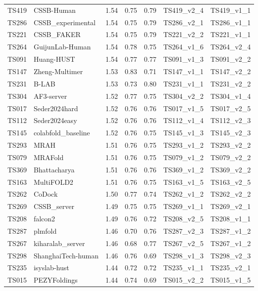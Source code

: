 \begin{table}[ht]
{\begin{tabular}{llrrrll}
TS419 & CSSB-Human & 1.54 & 0.75 & 0.79 & TS419\_v2\_4 & TS419\_v1\_1 \\ 
TS286 & CSSB\_experimental & 1.54 & 0.75 & 0.79 & TS286\_v2\_1 & TS286\_v1\_1 \\ 
TS221 & CSSB\_FAKER & 1.54 & 0.75 & 0.79 & TS221\_v2\_2 & TS221\_v1\_1 \\ 
TS264 & GuijunLab-Human & 1.54 & 0.78 & 0.75 & TS264\_v1\_6 & TS264\_v2\_4 \\ 
TS091 & Huang-HUST & 1.54 & 0.77 & 0.77 & TS091\_v1\_3 & TS091\_v2\_2 \\ 
TS147 & Zheng-Multimer & 1.53 & 0.83 & 0.71 & TS147\_v1\_1 & TS147\_v2\_2 \\ 
TS231 & B-LAB & 1.53 & 0.73 & 0.80 & TS231\_v1\_1 & TS231\_v2\_2 \\ 
TS304 & AF3-server & 1.52 & 0.77 & 0.75 & TS304\_v2\_2 & TS304\_v1\_4 \\ 
TS017 & Seder2024hard & 1.52 & 0.76 & 0.76 & TS017\_v1\_5 & TS017\_v2\_5 \\ 
TS112 & Seder2024easy & 1.52 & 0.76 & 0.76 & TS112\_v1\_4 & TS112\_v2\_3 \\ 
TS145 & colabfold\_baseline & 1.52 & 0.76 & 0.75 & TS145\_v1\_3 & TS145\_v2\_3 \\ 
TS293 & MRAH & 1.51 & 0.76 & 0.75 & TS293\_v1\_2 & TS293\_v2\_2 \\ 
TS079 & MRAFold & 1.51 & 0.76 & 0.75 & TS079\_v1\_2 & TS079\_v2\_2 \\ 
TS369 & Bhattacharya & 1.51 & 0.76 & 0.76 & TS369\_v1\_2 & TS369\_v2\_2 \\ 
TS163 & MultiFOLD2 & 1.51 & 0.76 & 0.75 & TS163\_v1\_5 & TS163\_v2\_5 \\ 
TS262 & CoDock & 1.50 & 0.77 & 0.74 & TS262\_v1\_2 & TS262\_v2\_2 \\ 
TS269 & CSSB\_server & 1.49 & 0.75 & 0.75 & TS269\_v1\_1 & TS269\_v2\_1 \\ 
TS208 & falcon2 & 1.49 & 0.76 & 0.72 & TS208\_v2\_5 & TS208\_v1\_1 \\ 
TS287 & plmfold & 1.46 & 0.70 & 0.76 & TS287\_v2\_3 & TS287\_v1\_2 \\ 
TS267 & kiharalab\_server & 1.46 & 0.68 & 0.77 & TS267\_v2\_5 & TS267\_v1\_2 \\ 
TS298 & ShanghaiTech-human & 1.46 & 0.76 & 0.69 & TS298\_v1\_3 & TS298\_v2\_3 \\ 
TS235 & isyslab-hust & 1.44 & 0.72 & 0.72 & TS235\_v1\_1 & TS235\_v2\_1 \\ 
TS015 & PEZYFoldings & 1.44 & 0.74 & 0.69 & TS015\_v2\_2 & TS015\_v1\_5 \\ 

\end{tabular}}
\end{table}
